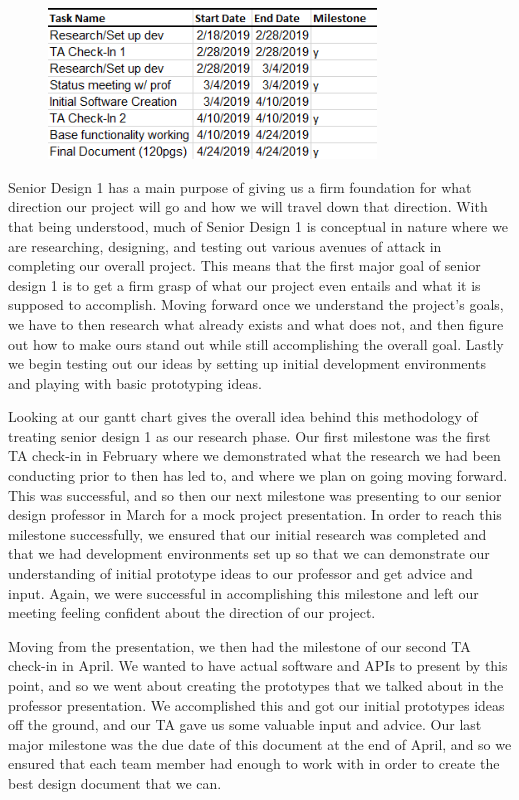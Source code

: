 \documentclass[12pt]{report}
\begin{document}
\newpage

\begin{figure}[h]
	\centering
	\includegraphics[width=0.6\linewidth, height=4.0cm]{SD1Dates}
\end{figure}

Senior Design 1 has a main purpose of giving us a firm foundation for what direction our project will go and how we will travel down that direction. With that being understood, much of Senior Design 1 is conceptual in nature where we are researching, designing, and testing out various avenues of attack in completing our overall project. This means that the first major goal of senior design 1 is to get a firm grasp of what our project even entails and what it is supposed to accomplish. Moving forward once we understand the project's goals, we have to then research what already exists and what does not, and then figure out how to make ours stand out while still accomplishing the overall goal. Lastly we begin testing out our ideas by setting up initial development environments and playing with basic prototyping ideas.

Looking at our gantt chart gives the overall idea behind this methodology of treating senior design 1 as our research phase. Our first milestone was the first TA check-in in February where we demonstrated what the research we had been conducting prior to then has led to, and where we plan on going moving forward. This was successful, and so then our next milestone was presenting to our senior design professor in March for a mock project presentation. In order to reach this milestone successfully, we ensured that our initial research was completed and that we had development environments set up so that we can demonstrate our understanding of initial prototype ideas to our professor and get advice and input. Again, we were successful in accomplishing this milestone and left our meeting feeling confident about the direction of our project.

Moving from the presentation, we then had the milestone of our second TA check-in in April. We wanted to have actual software and APIs to present by this point, and so we went about creating the prototypes that we talked about in the professor presentation. We accomplished this and got our initial prototypes ideas off the ground, and our TA gave us some valuable input and advice. Our last major milestone was the due date of this document at the end of April, and so we ensured that each team member had enough to work with in order to create the best design document that we can.
\end{document}
